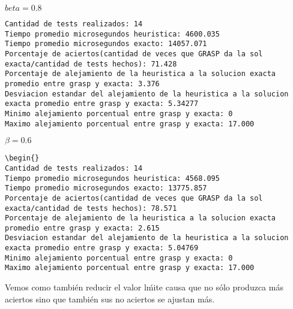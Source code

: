 $beta = 0.8$
\begin{lstlisting}[frame=single]
Cantidad de tests realizados: 14
Tiempo promedio microsegundos heuristica: 4600.035
Tiempo promedio microsegundos exacto: 14057.071
Porcentaje de aciertos(cantidad de veces que GRASP da la sol exacta/cantidad de tests hechos): 71.428
Porcentaje de alejamiento de la heuristica a la solucion exacta promedio entre grasp y exacta: 3.376
Desviacion estandar del alejamiento de la heuristica a la solucion exacta promedio entre grasp y exacta: 5.34277
Minimo alejamiento porcentual entre grasp y exacta: 0
Maximo alejamiento porcentual entre grasp y exacta: 17.000
\end{lstlisting}

$\beta = 0.6$

\begin{lstlisting}[frame=single]
\begin{}
Cantidad de tests realizados: 14
Tiempo promedio microsegundos heuristica: 4568.095
Tiempo promedio microsegundos exacto: 13775.857
Porcentaje de aciertos(cantidad de veces que GRASP da la sol exacta/cantidad de tests hechos): 78.571
Porcentaje de alejamiento de la heuristica a la solucion exacta promedio entre grasp y exacta: 2.615
Desviacion estandar del alejamiento de la heuristica a la solucion exacta promedio entre grasp y exacta: 5.04769
Minimo alejamiento porcentual entre grasp y exacta: 0
Maximo alejamiento porcentual entre grasp y exacta: 17.000
\end{lstlisting}

Vemos como tambi\'en reducir el valor l\'mite causa que no s\'olo produzca m\'as aciertos sino que tambi\'en sus no aciertos se ajustan m\'as.
%
%
%


